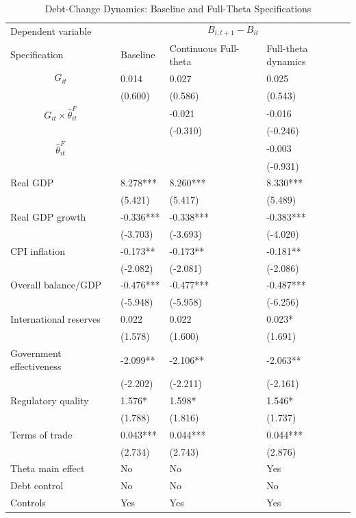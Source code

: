 \begin{table}[H]\centering
\begin{threeparttable}
\caption{Debt-Change Dynamics: Baseline and Full-Theta Specifications}
\label{tab:debt_change_combined_fulltheta}
\scriptsize
\begin{tabularx}{\textwidth}{lYYY}
\toprule
Dependent variable &  \\
\cmidrule(lr){2-4}
Specification & Baseline & Continuous Full-theta & Full-theta dynamics \\
\midrule
$$G_{it}$$ & 0.014 & 0.027 & 0.025 \\
 & (0.600) & (0.586) & (0.543) \\
$$G_{it}\times\widehat{\theta}^{F}_{it}$$ &  & -0.021 & -0.016 \\
 &  & (-0.310) & (-0.246) \\
$$\widehat{\theta}^{F}_{it}$$ &  &  & -0.003 \\
 &  &  & (-0.931) \\
Real GDP & 8.278*** & 8.260*** & 8.330*** \\
 & (5.421) & (5.417) & (5.489) \\
Real GDP growth & -0.336*** & -0.338*** & -0.383*** \\
 & (-3.703) & (-3.693) & (-4.020) \\
CPI inflation & -0.173** & -0.173** & -0.181** \\
 & (-2.082) & (-2.081) & (-2.086) \\
Overall balance/GDP & -0.476*** & -0.477*** & -0.487*** \\
 & (-5.948) & (-5.958) & (-6.256) \\
International reserves & 0.022 & 0.022 & 0.023* \\
 & (1.578) & (1.600) & (1.691) \\
Government effectiveness & -2.099** & -2.106** & -2.063** \\
 & (-2.202) & (-2.211) & (-2.161) \\
Regulatory quality & 1.576* & 1.598* & 1.546* \\
 & (1.788) & (1.816) & (1.737) \\
Terms of trade & 0.043*** & 0.044*** & 0.044*** \\
 & (2.734) & (2.743) & (2.876) \\
\midrule
Theta main effect & No & No & Yes \\
Debt control & No & No & No \\
Controls & Yes & Yes & Yes \\

\end{tabularx}
\end{threeparttable}
\end{table}
